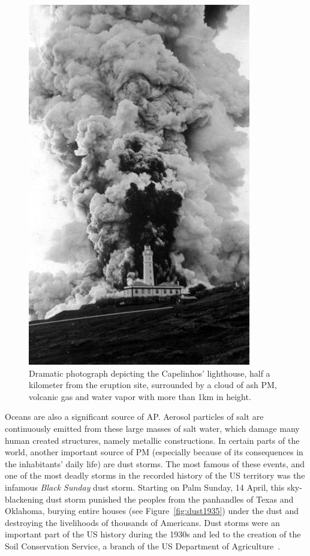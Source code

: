 \begin{figure}[htpb]
    \centering
    \includegraphics[width=0.8\linewidth]{img/jpg/capelinhos1957.jpeg}
    \caption{Dramatic photograph depicting the Capelinhos' lighthouse,
    half a kilometer from the eruption site, surrounded by a cloud of
    ash \gls{PM}, volcanic gas and water vapor with more than 1km in
    height\cite{TSF2017}.}
    \label{fig:capelinhos1957}
\end{figure}

Oceans are also a significant source of \gls{AP}. Aerosol particles of
salt are continuously emitted from these large masses of salt water,
which damage many human created structures, namely metallic
constructions. In certain parts of the world, another important source
of \acrlong{PM} (especially because of its consequences in the
inhabitants' daily life) are dust storms. The most famous of these
events, and one of the most deadly storms in the recorded history of the
US territory was the infamous \emph{Black Sunday} dust storm. Starting
on Palm Sunday, 14 April, this sky-blackening dust storm punished the
peoples from the panhandles of Texas and Oklahoma, burying entire houses
(see Figure~\ref{fig:dust1935}) under the dust and destroying the
livelihoods of thousands of Americans. Dust storms were an important
part of the US history during the 1930s and led to the creation of the
Soil Conservation Service, a branch of the US Department of
Agriculture~\cite{Vallero2014,Agriculture2012, Reis2008}.


